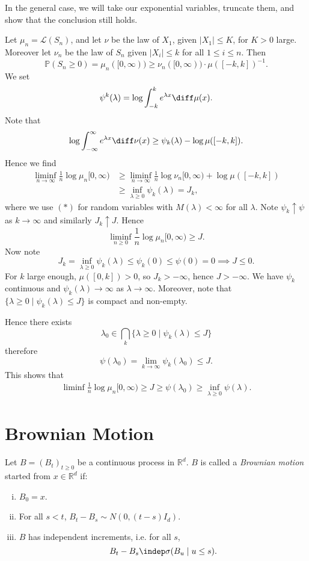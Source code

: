 \documentclass[12pt]{article}
\begin{document}
\begin{proofbox}
	In the general case, we will take our exponential variables, truncate them, and show that the conclusion still holds.

	Let $\mu_n = \mathcal{L}(S_n)$, and let $\nu$ be the law of $X_1$, given $|X_1| \leq K$, for $K > 0$ large. Moreover let $\nu_n$ be the law of $S_n$ given $|X_i| \leq k$ for all $1 \leq i \leq n$. Then
	\[
		\mathbb{P}(S_n \geq 0) = \mu_n([0, \infty)) \geq \nu_n([0, \infty)) \cdot \mu([-k, k])^{-1}.
	\]
	We set
	\[
	\psi^{k}(\lambda) = \log \int_{-k}^k e^{\lambda x} \diff \mu(x).
	\]
	Note that
	\[
		\log \int_{-\infty}^{\infty} e^{\lambda x} \diff \nu(x) \geq \psi_k(\lambda) - \log \mu([-k,k]).
	\]
	Hence we find
	\begin{align*}
		\liminf_{n \to \infty} \frac 1n \log \mu_n[0, \infty) &\geq \liminf_{n \to \infty} \frac 1n \log \nu_n [0, \infty) + \log \mu([-k, k]) \\
								      &\geq \inf_{\lambda \geq 0} \psi_k(\lambda) = J_k,
	\end{align*}
	where we use $(\ast)$ for random variables with $M(\lambda) < \infty$ for all $\lambda$. Note $\psi_k \uparrow \psi$ as $k \to \infty$ and similarly $J_k \uparrow J$. Hence
	\[
	\liminf_{n \geq 0} \frac 1n \log \mu_n[0, \infty) \geq J.
	\]
	Now note
	\[
	J_k = \inf_{\lambda \geq 0} \psi_k(\lambda) \leq \psi_k(0) \leq \psi(0) = 0 \implies J \leq 0.
	\]
	For $k$ large enough, $\mu([0, k]) > 0$, so $J_k > -\infty$, hence $J>  -\infty$. We have $\psi_k$ continuous and $\psi_k(\lambda) \to \infty$  as $\lambda \to \infty$. Moreover, note that $\{\lambda \geq 0 \mid \psi_k(\lambda) \leq J\}$ is compact and non-empty.

	Hence there exists
	\[
		\lambda_0 \in \bigcap_k \{ \lambda \geq 0 \mid \psi_k(\lambda) \leq J\}
	\]
	therefore
	\[
	\psi(\lambda_0) = \lim_{k \to \infty} \psi_k(\lambda_0) \leq J.
	\]
	This shows that
	\begin{align*}
		\liminf \frac 1n \log \mu_n[0, \infty) \geq J \geq \psi(\lambda_0) \geq \inf_{\lambda \geq 0} \psi(\lambda).
	\end{align*}
\end{proofbox}


\newpage

\section{Brownian Motion}%
\label{sec:b}

\begin{definition}
	Let $B = (B_t)_{t \geq 0}$ be a continuous process in $\mathbb{R}^{d}$. $B$ is called a \emph{Brownian motion} started from $x \in \mathbb{R}^{d}$ if:
	\begin{enumerate}[(i)]
		\item $B_0 = x$.
		\item For all $s < t$, $B_t - B_s \sim N(0, (t - s)I_d)$.
		\item $B$ has independent increments, i.e. for all $s$,
			\[
			B_{t} - B_s \indep \sigma(B_u \mid u \leq s).
			\]
	\end{enumerate}
\end{definition}
\end{document}
